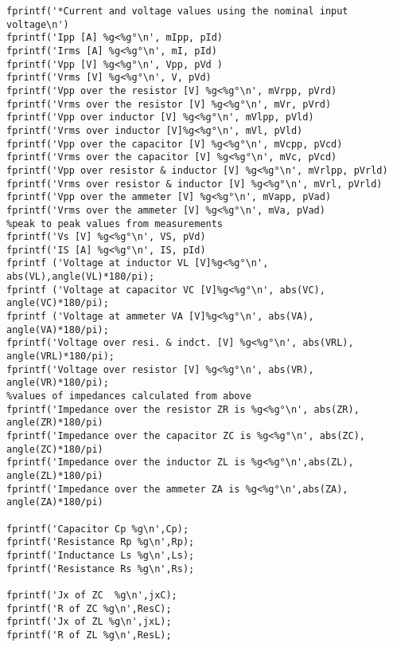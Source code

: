 \documentclass[12pt]{report}
\begin{document}
\begin{verbatim}
fprintf('*Current and voltage values using the nominal input voltage\n')
fprintf('Ipp [A] %g<%g°\n', mIpp, pId)
fprintf('Irms [A] %g<%g°\n', mI, pId)
fprintf('Vpp [V] %g<%g°\n', Vpp, pVd )
fprintf('Vrms [V] %g<%g°\n', V, pVd)
fprintf('Vpp over the resistor [V] %g<%g°\n', mVrpp, pVrd)
fprintf('Vrms over the resistor [V] %g<%g°\n', mVr, pVrd)
fprintf('Vpp over inductor [V] %g<%g°\n', mVlpp, pVld)
fprintf('Vrms over inductor [V]%g<%g°\n', mVl, pVld)
fprintf('Vpp over the capacitor [V] %g<%g°\n', mVcpp, pVcd)
fprintf('Vrms over the capacitor [V] %g<%g°\n', mVc, pVcd)
fprintf('Vpp over resistor & inductor [V] %g<%g°\n', mVrlpp, pVrld)
fprintf('Vrms over resistor & inductor [V] %g<%g°\n', mVrl, pVrld)
fprintf('Vpp over the ammeter [V] %g<%g°\n', mVapp, pVad)
fprintf('Vrms over the ammeter [V] %g<%g°\n', mVa, pVad)
%peak to peak values from measurements 
fprintf('Vs [V] %g<%g°\n', VS, pVd)
fprintf('IS [A] %g<%g°\n', IS, pId)
fprintf ('Voltage at inductor VL [V]%g<%g°\n', abs(VL),angle(VL)*180/pi);
fprintf ('Voltage at capacitor VC [V]%g<%g°\n', abs(VC), angle(VC)*180/pi);
fprintf ('Voltage at ammeter VA [V]%g<%g°\n', abs(VA), angle(VA)*180/pi);
fprintf('Voltage over resi. & indct. [V] %g<%g°\n', abs(VRL), angle(VRL)*180/pi);
fprintf('Voltage over resistor [V] %g<%g°\n', abs(VR), angle(VR)*180/pi);
%values of impedances calculated from above
fprintf('Impedance over the resistor ZR is %g<%g°\n', abs(ZR), angle(ZR)*180/pi)
fprintf('Impedance over the capacitor ZC is %g<%g°\n', abs(ZC), angle(ZC)*180/pi)
fprintf('Impedance over the inductor ZL is %g<%g°\n',abs(ZL), angle(ZL)*180/pi)
fprintf('Impedance over the ammeter ZA is %g<%g°\n',abs(ZA), angle(ZA)*180/pi)

fprintf('Capacitor Cp %g\n',Cp);
fprintf('Resistance Rp %g\n',Rp);
fprintf('Inductance Ls %g\n',Ls);
fprintf('Resistance Rs %g\n',Rs);

fprintf('Jx of ZC  %g\n',jxC);
fprintf('R of ZC %g\n',ResC);
fprintf('Jx of ZL %g\n',jxL);
fprintf('R of ZL %g\n',ResL);
\end{verbatim}
\end{document}
